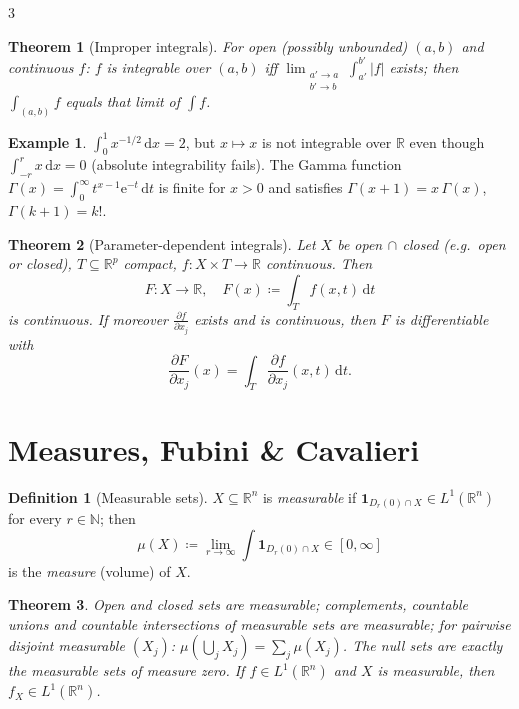 \documentclass[10pt,a4paper,landscape]{article}
\theoremstyle{definition}
\newtheorem{defn}{Definition}[section]
\newtheorem{exm}{Example}[section]
\theoremstyle{plain}
\newtheorem{thm}{Theorem}[section]
\theoremstyle{remark}
\newcommand{\R}{\mathbb{R}}
\newcommand{\N}{\mathbb{N}}
\newcommand{\dd}{\,\mathrm{d}}
\newcommand{\e}{\mathrm{e}}
\newcommand{\abs}[1]{\lvert #1 \rvert}
\newcommand{\oo}{\infty}
\newcommand{\deq}{\coloneqq}
\newcommand{\One}[1]{\mathbf{1}_{#1}}
\begin{document}
\begin{multicols*}{3}
\begin{thm}[Improper integrals]
For open (possibly unbounded) $(a,b)$ and continuous $f$: $f$ is integrable over $(a,b)$ iff $\lim_{\substack{a' \to a \\ b' \to b}} \int_{a'}^{b'} \abs{f}$ exists; then $\int_{(a,b)} f$ equals that limit of $\int f$.
\end{thm}

\begin{exm}
$\int_0^1 x^{-1/2}\dd x = 2$, but $x \mapsto x$ is not integrable over $\R$ even though $\int_{-r}^{r} x \dd x = 0$ (absolute integrability fails). The Gamma function $\Gamma(x) = \int_0^{\oo} t^{x-1} \e^{-t} \dd t$ is finite for $x > 0$ and satisfies $\Gamma(x+1) = x\,\Gamma(x)$, $\Gamma(k+1) = k!$.
\end{exm}

\begin{thm}[Parameter-dependent integrals]
Let $X$ be open$\,\cap\,$closed (e.g.\ open or closed), $T \subseteq \R^p$ compact, $f: X \times T \to \R$ continuous. Then
\[
F: X \to \R, \quad F(x) \deq \int_T f(x,t) \dd t
\]
is continuous. If moreover $\frac{\partial f}{\partial x_j}$ exists and is continuous, then $F$ is differentiable with
\[
\frac{\partial F}{\partial x_j}(x) = \int_T \frac{\partial f}{\partial x_j}(x,t) \dd t .
\]
\end{thm}

\section{Measures, Fubini \& Cavalieri}

\begin{defn}[Measurable sets]
$X \subseteq \R^n$ is \emph{measurable} if $\One{D_r(0) \cap X} \in L^1(\R^n)$ for every $r \in \N$; then
\[
\mu(X) \deq \lim_{r \to \oo} \int \One{D_r(0) \cap X} \in [0,\oo]
\]
is the \emph{measure} (volume) of $X$.
\end{defn}

\begin{thm}
Open and closed sets are measurable; complements, countable unions and countable intersections of measurable sets are measurable; for pairwise disjoint measurable $(X_j)$: $\mu(\bigcup_j X_j) = \sum_j \mu(X_j)$. The null sets are exactly the measurable sets of measure zero. If $f \in L^1(\R^n)$ and $X$ is measurable, then $f_X \in L^1(\R^n)$.
\end{thm}


\end{multicols*}
\end{document}
